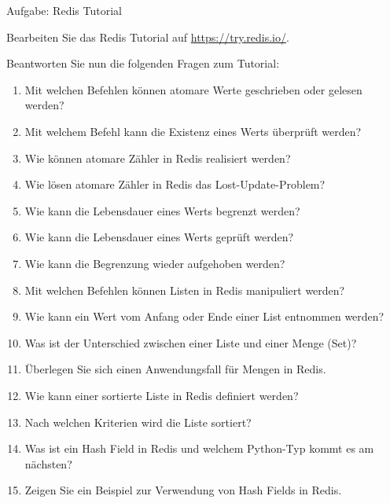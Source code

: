 \begin{frame}[allowframebreaks]{Aufgabe: Redis Tutorial}
    \setlength{\fboxsep}{0em}

    Bearbeiten Sie das Redis Tutorial auf \url{https://try.redis.io/}.

    \framebreak

    {
        \footnotesize
        Beantworten Sie nun die folgenden Fragen zum Tutorial:
    }
    \bigskip
    {
    \scriptsize

    \begin{enumerate}
        \item Mit welchen Befehlen können atomare Werte geschrieben oder gelesen werden?
        \item Mit welchem Befehl kann die Existenz eines Werts überprüft werden?
        \item Wie können atomare Zähler in Redis realisiert werden?
        \item Wie lösen atomare Zähler in Redis das Lost-Update-Problem?
        \item Wie kann die Lebensdauer eines Werts begrenzt werden?
        \item Wie kann die Lebensdauer eines Werts geprüft werden?
        \item Wie kann die Begrenzung wieder aufgehoben werden?
        \item Mit welchen Befehlen können Listen in Redis manipuliert werden?
        \item Wie kann ein Wert vom Anfang oder Ende einer List entnommen werden?
        \item Was ist der Unterschied zwischen einer Liste und einer Menge (Set)?
        \item Überlegen Sie sich einen Anwendungsfall für Mengen in Redis.
        \item Wie kann einer sortierte Liste in Redis definiert werden?
        \item Nach welchen Kriterien wird die Liste sortiert?
        \item Was ist ein Hash Field in Redis und welchem Python-Typ kommt es am nächsten?
        \item Zeigen Sie ein Beispiel zur Verwendung von Hash Fields in Redis.
    \end{enumerate}
    }
\end{frame}

